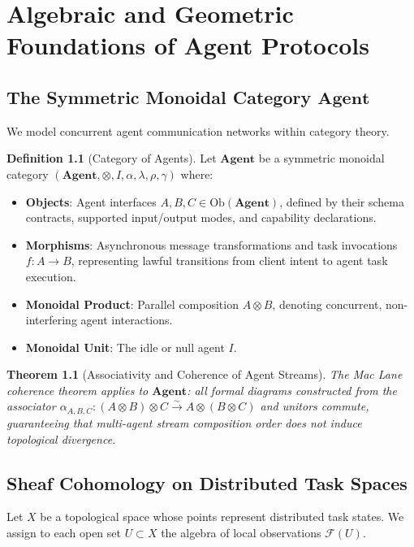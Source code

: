\documentclass[11pt,twoside,openright]{report}
\theoremstyle{definition}
\newtheorem{definition}{Definition}[chapter]
\theoremstyle{plain}
\newtheorem{theorem}{Theorem}[chapter]
\theoremstyle{remark}
\newcommand{\CatAgent}{\mathbf{Agent}}
\begin{document}
\chapter{Algebraic and Geometric Foundations of Agent Protocols}
\label{ch:algebra}

\section{The Symmetric Monoidal Category $\CatAgent$}
We model concurrent agent communication networks within category theory.

\begin{definition}[Category of Agents]
Let $\CatAgent$ be a symmetric monoidal category $(\CatAgent, \otimes, I, \alpha, \lambda, \rho, \gamma)$ where:
\begin{itemize}
    \item \textbf{Objects}: Agent interfaces $A, B, C \in \mathrm{Ob}(\CatAgent)$, defined by their schema contracts, supported input/output modes, and capability declarations.
    \item \textbf{Morphisms}: Asynchronous message transformations and task invocations $f: A \to B$, representing lawful transitions from client intent to agent task execution.
    \item \textbf{Monoidal Product}: Parallel composition $A \otimes B$, denoting concurrent, non-interfering agent interactions.
    \item \textbf{Monoidal Unit}: The idle or null agent $I$.
\end{itemize}
\end{definition}

\begin{theorem}[Associativity and Coherence of Agent Streams]
The Mac Lane coherence theorem applies to $\CatAgent$: all formal diagrams constructed from the associator $\alpha_{A,B,C}: (A \otimes B) \otimes C \xrightarrow{\sim} A \otimes (B \otimes C)$ and unitors commute, guaranteeing that multi-agent stream composition order does not induce topological divergence.
\end{theorem}

\section{Sheaf Cohomology on Distributed Task Spaces}
Let $X$ be a topological space whose points represent distributed task states. We assign to each open set $U \subset X$ the algebra of local observations $\mathcal{F}(U)$.
\end{document}

